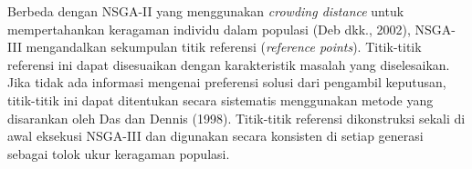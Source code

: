 Berbeda dengan NSGA-II yang menggunakan \textit{crowding distance} untuk mempertahankan keragaman individu dalam populasi (Deb dkk., 2002), NSGA-III mengandalkan sekumpulan titik referensi (\textit{reference points}). Titik-titik referensi ini dapat disesuaikan dengan karakteristik masalah yang diselesaikan. Jika tidak ada informasi mengenai preferensi solusi dari pengambil keputusan, titik-titik ini dapat ditentukan secara sistematis menggunakan metode yang disarankan oleh Das dan Dennis (1998). Titik-titik referensi dikonstruksi sekali di awal eksekusi NSGA-III dan digunakan secara konsisten di setiap generasi sebagai tolok ukur keragaman populasi.
